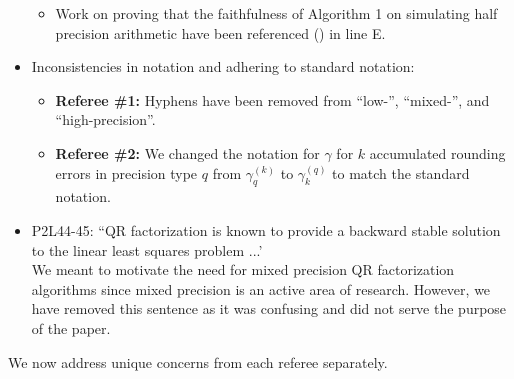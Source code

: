\documentclass[10pt]{article}
\begin{document}
\begin{itemize}
\begin{itemize}
    	\item Work on proving that the faithfulness of Algorithm 1 on simulating half precision arithmetic have been referenced (\cite{HighamPranesh2019b}) in line E. 
    \end{itemize}
	\item Inconsistencies in notation and adhering to standard notation:
	\begin{itemize}\normalfont
		\item \textbf{Referee \#1: }Hyphens have been removed from ``low-'', ``mixed-'', and ``high-precision''.
		\item \textbf{Referee \#2: }We changed the notation for $\gamma$ for $k$ accumulated rounding errors in precision type $q$ from $\gamma_{q}^{(k)}$ to $\gamma_{k}^{(q)}$ to match the standard notation.
	\end{itemize}
	\item P2L44-45: ``QR factorization is known to provide a backward stable solution to the linear least squares problem ...' \\
	{\normalfont
	We meant to motivate the need for mixed precision QR factorization algorithms since mixed precision is an active area of research.
	However, we have removed this sentence as it was confusing and did not serve the purpose of the paper.
	}
\end{itemize}

We now address unique concerns from each referee separately.
\end{document}
